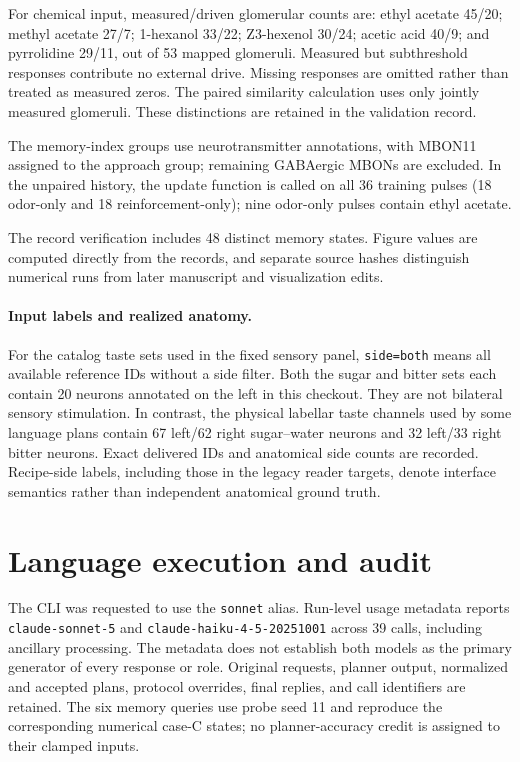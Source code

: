 For chemical input, measured/driven glomerular counts are: ethyl acetate 45/20; methyl acetate 27/7; 1-hexanol 33/22; Z3-hexenol 30/24; acetic acid 40/9; and pyrrolidine 29/11, out of 53 mapped glomeruli. Measured but subthreshold responses contribute no external drive. Missing responses are omitted rather than treated as measured zeros. The paired similarity calculation uses only jointly measured glomeruli. These distinctions are retained in the validation record.

The memory-index groups use neurotransmitter annotations, with MBON11 assigned to the approach group; remaining GABAergic MBONs are excluded. In the unpaired history, the update function is called on all 36 training pulses (18 odor-only and 18 reinforcement-only); nine odor-only pulses contain ethyl acetate.

The record verification includes 48 distinct memory states. Figure values are computed directly from the records, and separate source hashes distinguish numerical runs from later manuscript and visualization edits.


\paragraph{Input labels and realized anatomy.}
For the catalog taste sets used in the fixed sensory panel, \texttt{side=both} means all available reference IDs without a side filter. Both the sugar and bitter sets each contain 20 neurons annotated on the left in this checkout. They are not bilateral sensory stimulation. In contrast, the physical labellar taste channels used by some language plans contain 67 left/62 right sugar--water neurons and 32 left/33 right bitter neurons. Exact delivered IDs and anatomical side counts are recorded. Recipe-side labels, including those in the legacy reader targets, denote interface semantics rather than independent anatomical ground truth.

\section{Language execution and audit}
The CLI was requested to use the \texttt{sonnet} alias. Run-level usage metadata reports \texttt{claude-sonnet-5} and \texttt{claude-haiku-4-5-20251001} across 39 calls, including ancillary processing. The metadata does not establish both models as the primary generator of every response or role. Original requests, planner output, normalized and accepted plans, protocol overrides, final replies, and call identifiers are retained. The six memory queries use probe seed 11 and reproduce the corresponding numerical case-C states; no planner-accuracy credit is assigned to their clamped inputs.

